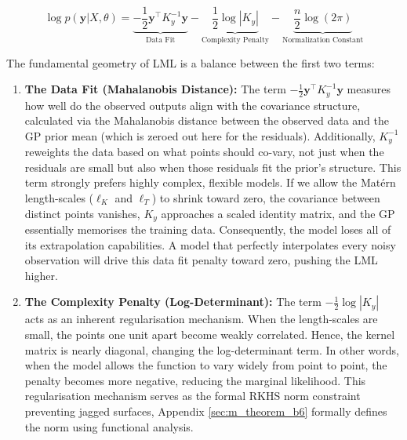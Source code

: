 \documentclass[12pt,oneside]{report}
\theoremstyle{definition}
\theoremstyle{remark}
\begin{document}
$$\log p(\mathbf{y} | X, \theta) = \underbrace{-\frac{1}{2}\mathbf{y}^\top K_y^{-1}\mathbf{y}}_{\text{Data Fit}} - \underbrace{\frac{1}{2}\log|K_y|}_{\text{Complexity Penalty}} - \underbrace{\frac{n}{2}\log(2\pi)}_{\text{Normalization Constant}}$$

The fundamental geometry of LML is a balance between the first two terms:
\begin{enumerate}
	\item \textbf{The Data Fit (Mahalanobis Distance):} The term $-\frac{1}{2}\mathbf{y}^\top K_y^{-1}\mathbf{y}$ measures how well do the observed outputs align with the covariance structure, calculated via the Mahalanobis distance between the observed data and the GP prior mean (which is zeroed out here for the residuals). Additionally, $K_y^{-1}$ reweights the data based on what points should co-vary, not just when the residuals are small but also when those residuals fit the prior's structure. This term strongly prefers highly complex, flexible models. If we allow the Matérn length-scales ($\ell_K$ and $\ell_T$) to shrink toward zero, the covariance between distinct points vanishes, $K_y$ approaches a scaled identity matrix, and the GP essentially memorises the training data. Consequently, the model loses all of its extrapolation capabilities. A model that perfectly interpolates every noisy observation will drive this data fit penalty toward zero, pushing the LML higher.

	\item \textbf{The Complexity Penalty (Log-Determinant):} The term $-\frac{1}{2}\log|K_y|$ acts as an inherent regularisation mechanism. When the length-scales are small, the points one unit apart become weakly correlated. Hence, the kernel matrix is nearly diagonal, changing the log-determinant term. In other words, when the model allows the function to vary widely from point to point, the penalty becomes more negative, reducing the marginal likelihood. This regularisation mechanism serves as the formal RKHS norm constraint preventing jagged surfaces, Appendix \ref{sec:m_theorem_b6} formally defines the norm using functional analysis.
\end{enumerate}
\end{document}
